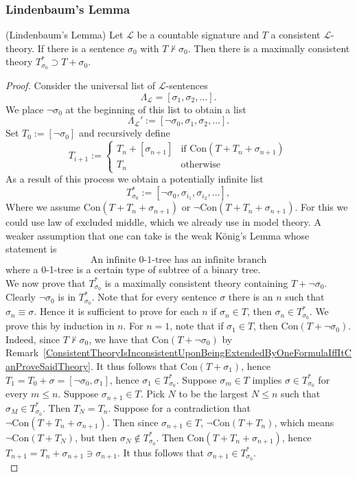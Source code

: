 \subsubsection{Lindenbaum's Lemma}
\begin{theorem}(Lindenbaum's Lemma) Let $\mathcal{L}$ be a countable signature and $T$ a consistent $\mathcal{L}$-theory. If there is a sentence $\sigma_0$ with $T\not\vdash \sigma_0$. Then there is a maximally consistent theory $T^\ast_{\sigma_0}\supset T+\sigma_0$. 
\end{theorem}
\begin{proof}
    Consider the universal list of $\mathcal{L}$-sentences
    $$\Lambda_\mathcal{L} = [\sigma_1,\sigma_2,\dots].$$    
    We place $\neg \sigma_0$ at the beginning of this list to obtain a list
    $$\Lambda_\mathcal{L}' := [\neg\sigma_0,\sigma_1,\sigma_2,\dots].$$
    Set $T_0 := [\neg\sigma_0]$ and recursively define 
    $$
        T_{i+1} := 
            \begin{cases}
                T_n + [\sigma_{n+1}] & \text{if } \mathrm{Con}(T+T_n+\sigma_{n+1})\\
                T_n & \text{otherwise}
            \end{cases}
    $$
    As a result of this process we obtain a potentially infinite list 
    $$T_{\sigma_0}^\ast := [\neg\sigma_0, \sigma_{i_1},\sigma_{i_2},\dots],$$
    Where we assume $\mathrm{Con}(T+T_n+\sigma_{n+1})$ or $\neg\mathrm{Con}(T+T_n+\sigma_{n+1})$. For this we could use law of excluded middle, which we already use in model theory. A weaker assumption that one can take is the weak König's Lemma whose statement is 
    $$\text{An infinite 0-1-tree has an infinite branch}$$
    where a 0-1-tree is a certain type of subtree of a binary tree.\\
    We now prove that $T^\ast_{\sigma_0}$ is a maximally consistent theory containing $T+\neg\sigma_0$. Clearly $\neg\sigma_0$ is in $T^\ast_{\sigma_0}$. Note that for every sentence $\sigma$ there is an $n$ such that $\sigma_n\equiv \sigma$. Hence it is sufficient to prove for each $n$ if $\sigma_n\in T$, then $\sigma_n\in T^\ast_{\sigma_0}$. We prove this by induction in $n$. For $n=1$, note that if $\sigma_1\in T$, then $\mathrm{Con}(T+\neg\sigma_0)$. Indeed, since $T\not\vdash \sigma_0$, we have that $\mathrm{Con}(T+\neg \sigma_0)$ by Remark~\ref{ConsistentTheoryIsInconsistentUponBeingExtendedByOneFormulaIffItCanProveSaidTheory}. It thus follows that $\mathrm{Con}(T+\sigma_1)$, hence $T_1=T_0+\sigma = [\neg\sigma_0,\sigma_1]$, hence $\sigma_1\in T^\ast_{\sigma_0}$. Suppose $\sigma_m\in T$ implies $\sigma\in T^\ast_{\sigma_0}$ for every $m\leq n$. Suppose $\sigma_{n+1}\in T$. Pick $N$ to be the largest $N\leq n$ such that $\sigma_M\in T^\ast_{\sigma_0}$. Then $T_N=T_n$. Suppose for a contradiction that $\neg\mathrm{Con}(T+T_n+\sigma_{n+1})$. Then since $\sigma_{n+1}\in T$, $\neg\mathrm{Con}(T+T_n)$, which means $\neg\mathrm{Con}(T+T_N)$, but then $\sigma_N\notin T^\ast_{\sigma_0}$. Then $\mathrm{Con}(T+T_n+\sigma_{n+1})$, hence $T_{n+1}=T_n+\sigma_{n+1}\ni \sigma_{n+1}$. It thus follows that $\sigma_{n+1}\in T^\ast_{\sigma_0}$.\\

\end{proof}
